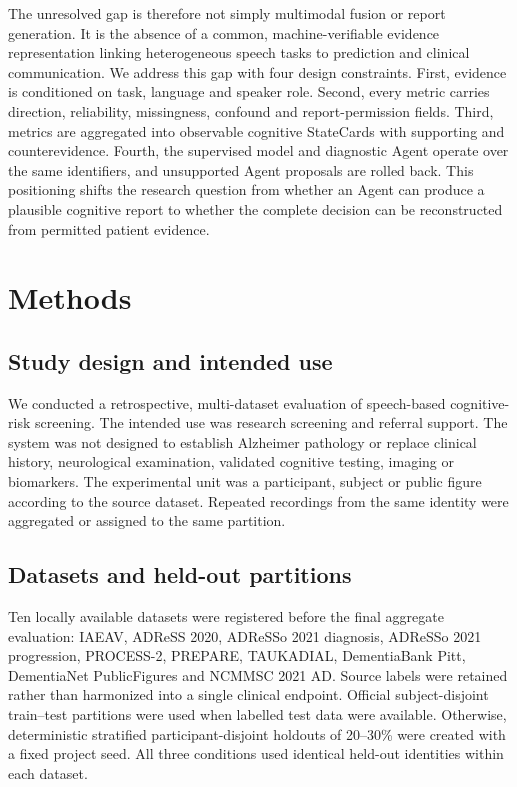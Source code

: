 \documentclass[pdflatex,sn-nature]{sn-jnl}
\begin{document}
The unresolved gap is therefore not simply multimodal fusion or report generation. It is the absence of a common, machine-verifiable evidence representation linking heterogeneous speech tasks to prediction and clinical communication. We address this gap with four design constraints. First, evidence is conditioned on task, language and speaker role. Second, every metric carries direction, reliability, missingness, confound and report-permission fields. Third, metrics are aggregated into observable cognitive StateCards with supporting and counterevidence. Fourth, the supervised model and diagnostic Agent operate over the same identifiers, and unsupported Agent proposals are rolled back. This positioning shifts the research question from whether an Agent can produce a plausible cognitive report to whether the complete decision can be reconstructed from permitted patient evidence.

\section{Methods}\label{sec:methods}

\subsection{Study design and intended use}

We conducted a retrospective, multi-dataset evaluation of speech-based cognitive-risk screening. The intended use was research screening and referral support. The system was not designed to establish Alzheimer pathology or replace clinical history, neurological examination, validated cognitive testing, imaging or biomarkers. The experimental unit was a participant, subject or public figure according to the source dataset. Repeated recordings from the same identity were aggregated or assigned to the same partition.

\subsection{Datasets and held-out partitions}

Ten locally available datasets were registered before the final aggregate evaluation: IAEAV, ADReSS 2020, ADReSSo 2021 diagnosis, ADReSSo 2021 progression, PROCESS-2, PREPARE, TAUKADIAL, DementiaBank Pitt, DementiaNet PublicFigures and NCMMSC 2021 AD. Source labels were retained rather than harmonized into a single clinical endpoint. Official subject-disjoint train--test partitions were used when labelled test data were available. Otherwise, deterministic stratified participant-disjoint holdouts of 20--30\% were created with a fixed project seed. All three conditions used identical held-out identities within each dataset.
\end{document}
